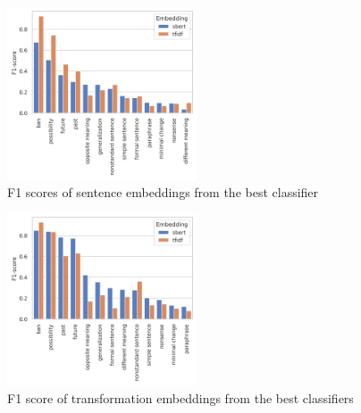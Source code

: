 \documentclass[11pt]{article}
\begin{document}
\begin{figure}[htp]
  \centering
  \includegraphics[width=0.5\textwidth]{figs/cls_gs_no_context_labels.png}
  \caption{F1 scores of sentence embeddings from the best classifier}\label{fig:cls_gs_no_context_labels}
\end{figure}
\begin{figure}[htp]
  \centering
  \includegraphics[width=0.5\textwidth]{./figs/cls_gs_diff_labels.png}

  \caption{F1 score of transformation embeddings from the
  best classifiers}\label{fig:cls_gs_diff_labels}
\end{figure}
\end{document}
